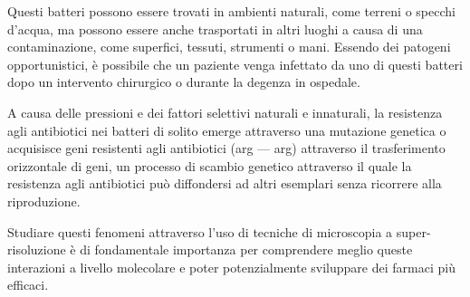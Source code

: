 \documentclass[../main.tex]{subfiles}
\begin{document}
Questi batteri possono essere trovati in ambienti naturali, come terreni o specchi d'acqua, ma possono essere anche trasportati in altri luoghi a causa di una contaminazione, come superfici, tessuti, strumenti o mani. Essendo dei patogeni opportunistici, è possibile che un paziente venga infettato da uno di questi batteri dopo un intervento chirurgico o durante la degenza in ospedale.\cite{cdc_2019}

A causa delle pressioni e dei fattori selettivi naturali e innaturali, la resistenza agli antibiotici nei batteri di solito emerge attraverso una mutazione genetica o acquisisce geni resistenti agli antibiotici (\acrlong{arg} --- \acrshort{arg}) attraverso il trasferimento orizzontale di geni, un processo di scambio genetico attraverso il quale la resistenza agli antibiotici può diffondersi ad altri esemplari senza ricorrere alla riproduzione.\cite{madigan_2015}\bigskip


\noindent Studiare questi fenomeni attraverso l'uso di tecniche di microscopia a super-risoluzione è di fondamentale importanza per comprendere meglio queste interazioni a livello molecolare e poter potenzialmente sviluppare dei farmaci più efficaci.
\end{document}
